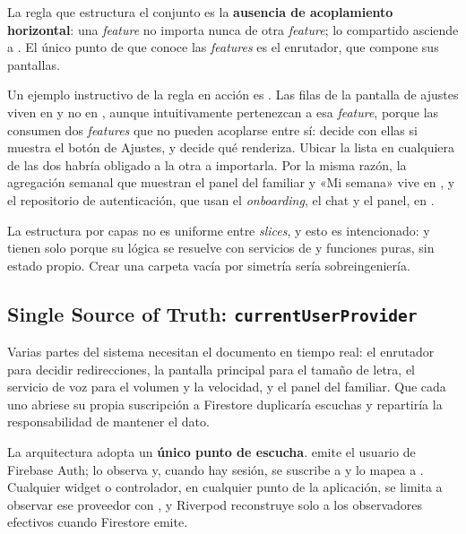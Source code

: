La regla que estructura el conjunto es la \textbf{ausencia de acoplamiento horizontal}: una \emph{feature}
no importa nunca de otra \emph{feature}; lo compartido asciende a . El único punto de
 que conoce las \emph{features} es el enrutador, que compone sus pantallas.

Un ejemplo instructivo de la regla en acción es . Las filas de la pantalla de
ajustes viven en  y no en , aunque intuitivamente pertenezcan
a esa \emph{feature}, porque las consumen dos \emph{features} que no pueden acoplarse entre sí:
 decide con ellas si muestra el botón de Ajustes, y  decide qué
renderiza. Ubicar la lista en cualquiera de las dos habría obligado a la otra a importarla. Por la misma
razón, la agregación semanal que muestran el panel del familiar y «Mi semana» vive en
, y el repositorio de autenticación, que usan el \emph{onboarding}, el
chat y el panel, en .

La estructura por capas no es uniforme entre \emph{slices}, y esto es intencionado:  y
 tienen solo  porque su lógica se resuelve con servicios de 
y funciones puras, sin estado propio. Crear una carpeta  vacía por simetría sería
sobreingeniería.

\subsection{Single Source of Truth: \texttt{currentUserProvider}}
\label{sec:ssot}

Varias partes del sistema necesitan el documento  en tiempo real: el enrutador para
decidir redirecciones, la pantalla principal para el tamaño de letra, el servicio de voz para el volumen y
la velocidad, y el panel del familiar. Que cada uno abriese su propia suscripción a Firestore duplicaría
escuchas y repartiría la responsabilidad de mantener el dato.

La arquitectura adopta un \textbf{único punto de escucha}.  emite
el usuario de Firebase Auth;  lo observa y, cuando hay sesión, se suscribe a
 y lo mapea a . Cualquier widget o controlador, en cualquier punto de
la aplicación, se limita a observar ese proveedor con , y Riverpod reconstruye solo a los
observadores efectivos cuando Firestore emite.

